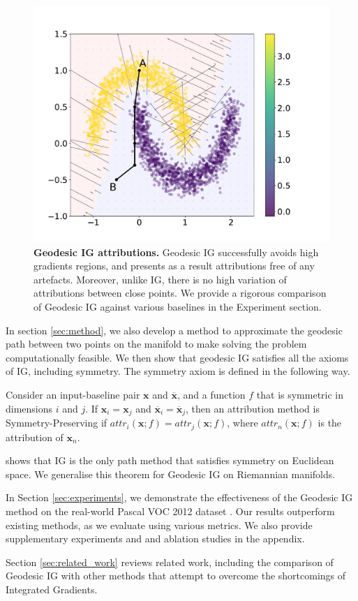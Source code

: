 \begin{figure}[h!]
\vskip 0.2in
\begin{center}
\centerline{\includegraphics[width=\columnwidth]{figures/geodesic_ig_y.pdf}}
\caption{\textbf{Geodesic IG attributions.} Geodesic IG successfully avoids high gradients regions, and presents as a result attributions free of any artefacts. Moreover, unlike IG, there is no high variation of attributions between close points. We provide a rigorous comparison of Geodesic IG against various baselines in the Experiment section.}
\label{fig:geodesic_ig}
\end{center}
\vskip -0.2in
\end{figure}

In section \ref{sec:method}, we also develop a method to approximate the geodesic path between two points on the manifold to make solving the problem computationally feasible. We then show that geodesic IG satisfies all the axioms of IG, including symmetry. The symmetry axiom is defined in the following way. 
\begin{definition}
Consider an input-baseline pair $\textbf{x}$ and $\overline{\textbf{x}}$, and a function $f$ that is symmetric in dimensions $i$ and $j$. If $\textbf{x}_i = \textbf{x}_j$ and $\overline{\textbf{x}}_i = \overline{\textbf{x}}_j$, then an attribution method is Symmetry-Preserving if $attr_i(\textbf{x}; f) = attr_j(\textbf{x}; f)$, where $attr_n(\textbf{x}; f)$ is the attribution of $\textbf{x}_n$.
\end{definition}
\citep[Theorem 1]{sundararajan2017axiomatic} shows that IG is the only path method that satisfies symmetry on Euclidean space. We generalise this theorem for Geodesic IG on Riemannian manifolds.

In Section \ref{sec:experiments}, we demonstrate the effectiveness of the Geodesic IG method on the real-world Pascal VOC 2012 dataset \citep{pascal-voc-2012}. Our results outperform existing methods, as we evaluate using various metrics. We also provide supplementary experiments and and ablation studies in the appendix.

Section \ref{sec:related_work} reviews related work, including the comparison of Geodesic IG with other methods that attempt to overcome the shortcomings of Integrated Gradients.